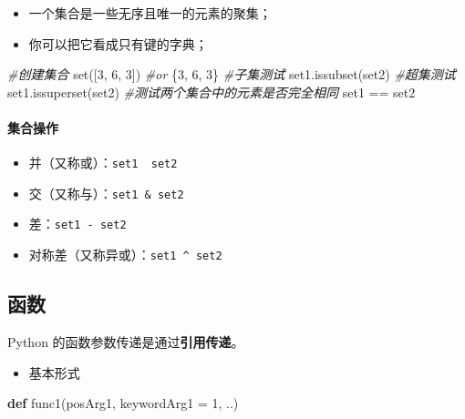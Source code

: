 \documentclass[]{ctexart}
\newenvironment{Shaded}{}{}
\newcommand{\KeywordTok}[1]{\textcolor[rgb]{0.00,0.44,0.13}{\textbf{{#1}}}}
\newcommand{\DecValTok}[1]{\textcolor[rgb]{0.25,0.63,0.44}{{#1}}}
\newcommand{\CommentTok}[1]{\textcolor[rgb]{0.38,0.63,0.69}{\textit{{#1}}}}
\newcommand{\OperatorTok}[1]{\textcolor[rgb]{0.40,0.40,0.40}{{#1}}}
\newcommand{\BuiltInTok}[1]{{#1}}
\newcommand{\NormalTok}[1]{{#1}}
\let\oldparagraph\paragraph
\renewcommand{\paragraph}[1]{\oldparagraph{#1}\mbox{}}
\begin{document}
\begin{itemize}
\item
  一个集合是一些无序且唯一的元素的聚集；
\item
  你可以把它看成只有键的字典；
\end{itemize}

\begin{Shaded}
\begin{Highlighting}[]
\CommentTok{#创建集合}
\BuiltInTok{set}\NormalTok{([}\DecValTok{3}\NormalTok{, }\DecValTok{6}\NormalTok{, }\DecValTok{3}\NormalTok{])}
\CommentTok{#or}
\NormalTok{\{}\DecValTok{3}\NormalTok{, }\DecValTok{6}\NormalTok{, }\DecValTok{3}\NormalTok{\}}
\CommentTok{#子集测试}
\NormalTok{set1.issubset(set2)}
\CommentTok{#超集测试}
\NormalTok{set1.issuperset(set2)}
\CommentTok{#测试两个集合中的元素是否完全相同}
\NormalTok{set1 }\OperatorTok{==} \NormalTok{set2}
\end{Highlighting}
\end{Shaded}

\paragraph{集合操作}\label{header-n198}

\begin{itemize}
\item
  并（又称或）：\texttt{set1\ \textbar{}\ set2}
\item
  交（又称与）：\texttt{set1\ \&\ set2}
\item
  差：\texttt{set1\ -\ set2}
\item
  对称差（又称异或）：\texttt{set1\ \^{}\ set2}
\end{itemize}

\hypertarget{header-n212}{\subsection{函数}\label{header-n212}}

Python 的函数参数传递是通过\textbf{引用传递}。

\begin{itemize}
\item
  基本形式
\end{itemize}

\begin{Shaded}
\begin{Highlighting}[]
\KeywordTok{def} \NormalTok{func1(posArg1, keywordArg1 }\OperatorTok{=} \DecValTok{1}\NormalTok{, ..)}
\end{Highlighting}
\end{Shaded}
\end{document}
